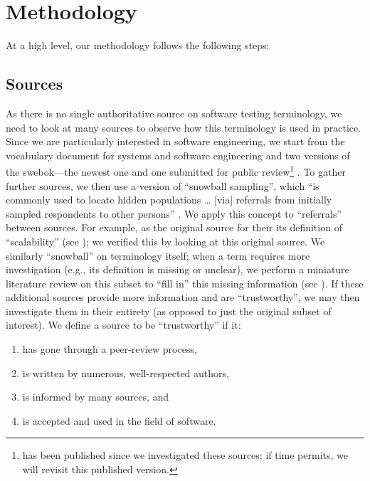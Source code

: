 \section{Methodology}
\label{methodology}

At a high level, our
methodology follows the following steps:



\def\addTextEx{For example, \citetISTQB{} \multiAuthHelper{cite}
    \citep{GerrardAndThompson2002} as the original source
    for \ifnotpaper their \else its \fi definition of ``scalability'' (see
    \Cref{scal-test-rec}); we verified\ptq{} this by
    looking at this original source.}

\subsection{Sources}
\label{sources}
As there is no single authoritative source on software testing terminology,
we need to look at many sources to observe how this terminology is used in
practice. Since we are particularly interested in software engineering, we
start from the vocabulary document for systems and software engineering%
\citep{IEEE2017} and two versions of the \acf{swebok}---the newest
one \citep{SWEBOK2014} and one submitted for public review\footnote{
     \citep{SWEBOK2024} has been published since we investigated
    these sources; if time permits, we will revisit this published version.
} \citep{SWEBOK2024}. To gather further sources, we then use a version of ``snowball sampling'',
which ``is commonly used to locate hidden populations \dots{} [via] referrals
from initially sampled respondents to other persons'' \citep{Johnson2014}. We
apply this concept to ``referrals'' between sources. \addTextEx{} We similarly
``snowball'' on terminology itself; when a term requires more investigation
(e.g., its definition is missing or unclear), we perform a
miniature literature review on this subset to ``fill in'' this missing
information (see ). If these additional sources provide more
information and are ``trustworthy'', we may then investigate them in their
entirety (as opposed to just the original subset of interest). We define a
source to be ``trustworthy'' if it:
\begin{enumerate}
    \item has gone through a peer-review process,
    \item is written by numerous, well-respected authors,
    \item is informed by many sources, and
    \item is accepted and used in the field of software.
\end{enumerate}

